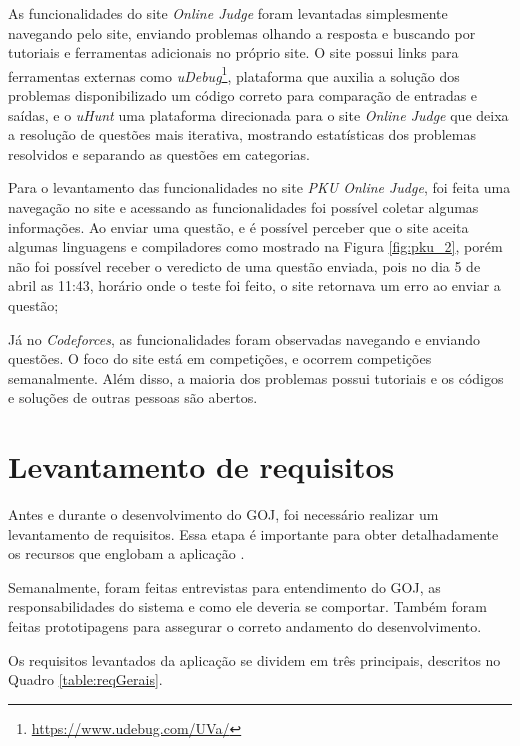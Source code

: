 As funcionalidades do site \textit{Online Judge} foram levantadas simplesmente navegando pelo site, enviando problemas olhando a resposta e buscando por tutoriais e ferramentas adicionais no próprio site. O site possui links para ferramentas externas como \textit{uDebug}\footnote{\url{https://www.udebug.com/UVa/}}, plataforma que auxilia a solução dos problemas disponibilizado um código correto para comparação de entradas e saídas, e o \textit{uHunt} uma plataforma direcionada para o site \textit{Online Judge} que deixa a resolução de questões mais iterativa, mostrando estatísticas dos problemas resolvidos e separando as questões em categorias. 

Para o levantamento das funcionalidades no site \textit{PKU Online Judge}, foi feita uma navegação no site e acessando as funcionalidades foi possível coletar algumas informações. Ao enviar uma questão, e é possível perceber que o site aceita algumas linguagens e compiladores como mostrado na Figura \ref{fig:pku_2}, porém não foi possível receber o veredicto de uma questão enviada, pois no dia 5 de abril as 11:43, horário onde o teste foi feito, o site retornava um erro ao enviar a questão;

Já no \textit{Codeforces}, as funcionalidades foram observadas navegando e enviando questões.  O foco do site está em competições, e ocorrem competições semanalmente. Além disso, a maioria dos problemas possui tutoriais e os códigos e soluções de outras pessoas são abertos.

\section{Levantamento de requisitos}
\label{sec:levantamentoDeRequisitos}

Antes e durante o desenvolvimento do GOJ, foi necessário realizar um levantamento de requisitos. Essa etapa é importante para obter detalhadamente os recursos que englobam a aplicação \cite{young2002recommended}.

Semanalmente, foram feitas entrevistas para entendimento do GOJ, as responsabilidades do sistema e como ele deveria se comportar. Também foram feitas prototipagens para assegurar o correto andamento do desenvolvimento.

Os requisitos levantados da aplicação se dividem em três principais, descritos no Quadro \ref{table:reqGerais}.

